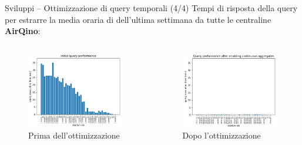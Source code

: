 \begin{frame}{Sviluppi – Ottimizzazione di query temporali (4/4)}
Tempi di risposta della query per estrarre la media oraria di  dell'ultima settimana da tutte le centraline \textbf{AirQino}:

\begin{columns}
\begin{column}{0.55\textwidth}
\begin{figure}[H]
\centering
\captionsetup{justification=centering}
\includegraphics[width=\textwidth]{images/query_prima}
\caption{Prima dell'ottimizzazione}
\end{figure}
\end{column}

\begin{column}{0.55\textwidth}
\begin{figure}[H]
\centering
\captionsetup{justification=centering}
\includegraphics[width=\textwidth]{images/query_dopo}
\caption{Dopo l'ottimizzazione}
\end{figure}
\end{column}
\end{columns}

\end{frame}


